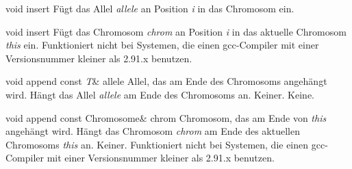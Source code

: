\documentclass{report}
\begin{document}
\newpage

    \setCorrectWidthThree{8pt}
    \printMethodWithParamsSaved
        {void}
        {}
        {insert}
        {F\"ugt das Allel {\em allele} an Position {\em i} in das Chromosom 
         ein.}
        {}
    \setCorrectWidthThree{4pt}

\vspace{4ex}    

    \setCorrectWidthThree{8pt}

    \printMethodWithParamsSaved
        {void}
        {}
        {insert}
        {F\"ugt das Chromosom {\em chrom} an Position {\em i} in das aktuelle Chromosom 
    {\em this} ein.}
        {Funktioniert nicht bei Systemen, die einen gcc-Compiler
    mit einer Versionsnummer kleiner als 2.91.x benutzen.}
    \setCorrectWidthThree{4pt}

\vspace{4ex}

    \printMethodWithOneParam
    {void} 
    {append}
    {const {\sl T}\&} 
    {allele} 
    {Allel, das am Ende des 
     Chromosoms angeh\"angt wird.}
    {H\"angt das Allel {\em allele} am Ende des Chromosoms an.}
    {Keiner.}
    {Keine.}

\newpage

    \printMethodWithOneParam
    {void} 
    {append}
    {const Chromosome\&}
    {chrom} 
    {Chromosom, das am Ende von 
    {\em this} angeh\"angt wird.}
    {H\"angt das Chromosom {\em chrom} am Ende des aktuellen Chromosoms {\em this} an.}
    {Keiner.}
    {Funktioniert nicht bei Systemen, die einen gcc-Compiler
    mit einer Versionsnummer kleiner als 2.91.x benutzen.}
\end{document}
